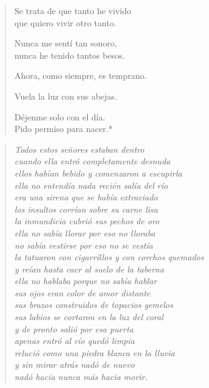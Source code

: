 \documentclass[12pt]{article}
\begin{document}
\begin{verse}
Se trata de que tanto he vivido\\
que quiero vivir otro tanto.  

Nunca me sentí tan sonoro,\\
nunca he tenido tantos besos.  

Ahora, como siempre, es temprano.  

Vuela la luz con sus abejas.  

Déjenme solo con el día.\\
Pido permiso para nacer.*  

\end{verse}

\clearpage
{}
\begin{verse}

\emph{Todos estos señores estaban dentro\\
cuando ella entró completamente desnuda\\
ellos habían bebido y comenzaron a escupirla\\
ella no entendía nada recién salía del río\\
era una sirena que se había extraviado\\
los insultos corrían sobre su carne lisa\\
la inmundicia cubrió sus pechos de oro\\
ella no sabía llorar por eso no lloraba\\
no sabía vestirse por eso no se vestía\\
la tatuaron con cigarrillos y con corchos quemados\\
y reían hasta caer al suelo de la taberna\\
ella no hablaba porque no sabía hablar\\
sus ojos eran color de amor distante\\
sus brazos construidos de topacios gemelos\\
sus labios se cortaron en la luz del coral\\
y de pronto salió por esa puerta\\
apenas entró al río quedó limpia\\
relució como una piedra blanca en la lluvia\\
y sin mirar atrás nadó de nuevo\\
nadó hacia nunca más hacia morir.}  

\end{verse}
\end{document}
